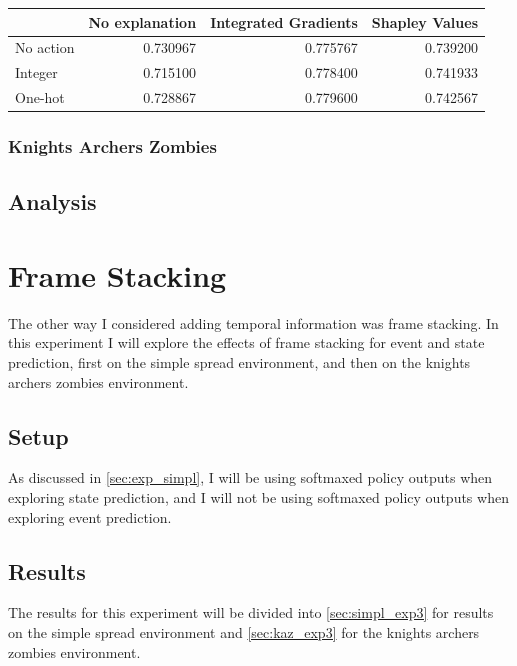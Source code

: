 \documentclass[UKenglish]{uiomasterthesis}
\begin{document}
\begin{center}
\label{tab:event_simpl_lstm}
\begin{tabular}{lrrr}
\toprule
 & No explanation & Integrated Gradients & Shapley Values \\
\midrule
No action & 0.730967 & 0.775767 & 0.739200 \\
Integer & 0.715100 & 0.778400 & 0.741933 \\
One-hot & 0.728867 & 0.779600 & 0.742567 \\
\bottomrule
\end{tabular}
\end{center}

\subsubsection{Knights Archers Zombies}


\subsection{Analysis}


\section{Frame Stacking}
\label{sec:exp_stack}
The other way I considered adding temporal information was frame stacking. In this experiment I will explore the effects of frame stacking for event and state prediction, first on the simple spread environment, and then on the knights archers zombies environment. 

\subsection{Setup}
As discussed in \cref{sec:exp_simpl}, I will be using softmaxed policy outputs when exploring state prediction, and I will not be using softmaxed policy outputs when exploring event prediction.

\subsection{Results}
The results for this experiment will be divided into \cref{sec:simpl_exp3} for results on the simple spread environment and \cref{sec:kaz_exp3} for the knights archers zombies environment.
\end{document}
